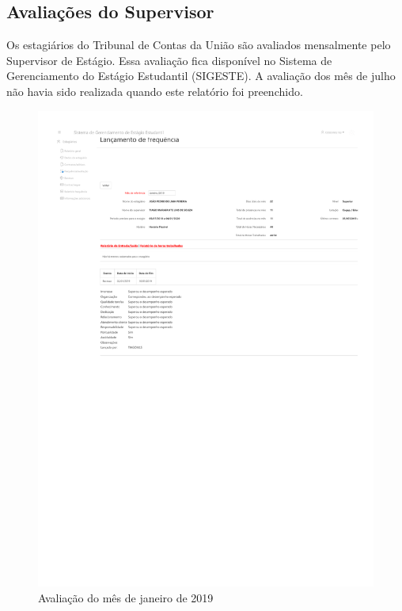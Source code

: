 \begin{anexosenv}

\partanexos

\chapter{Avaliações do Supervisor}
\label{appendix:avaliacoes}

Os estagiários do Tribunal de Contas da União são avaliados mensalmente pelo Supervisor de Estágio.
Essa avaliação fica disponível no Sistema de Gerenciamento do Estágio Estudantil (SIGESTE). A avaliação 
dos mês de julho não havia sido realizada quando este relatório foi preenchido. 

\begin{figure}
    \centering
    \includegraphics[trim=100 410 0 140, clip, width=\textwidth]{anexos/avaliacao201901}
    \caption{Avaliação do mês de janeiro de 2019}
    \label{fig:avaliacao201901}
\end{figure}


\end{anexosenv}
